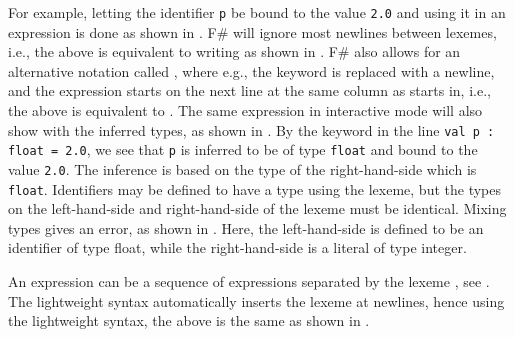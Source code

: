 \documentclass[fsharpnotes.tex]{subfiles}
\begin{document}
For example, letting the identifier \lstinline!p! be bound to the value \lstinline!2.0! and using it in an expression is done as shown in .
%
%
F\# will ignore most newlines between lexemes, i.e., the above is equivalent to writing as shown in .
%
%
F\# also allows for an alternative notation called , where e.g., the  keyword is replaced with a newline, and the expression starts on the next line at the same column as  starts in, i.e., the above is equivalent to .
%
%
The same expression in interactive mode will also show with the inferred types, as shown in .
%
%
By the  keyword in the line \lstinline!val p : float = 2.0!, we see that \lstinline!p! is inferred to be of type \lstinline!float! and bound to the value \lstinline!2.0!. The inference is based on the type of the right-hand-side which is \lstinline!float!.  Identifiers may be defined to have a type using the \lexeme{:} lexeme, but the types on the left-hand-side and right-hand-side of the \lexeme{=} lexeme must be identical. Mixing types gives an error, as shown in .
%
%
%
Here, the left-hand-side is defined to be an identifier of type float, while the right-hand-side is a literal of type integer.

An expression can be a sequence of expressions separated by the lexeme \lexeme{;}, see .
%
%
The lightweight syntax automatically inserts the \lexeme{;} lexeme at newlines, hence using the lightweight syntax, the above is the same as shown in .
%
%
\end{document}
